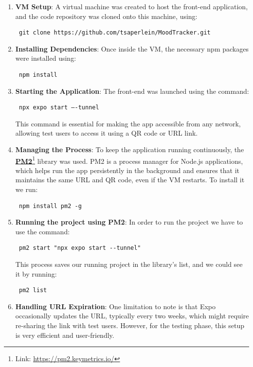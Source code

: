 \begin{enumerate}
    \item \textbf{VM Setup}: A virtual machine was created to host the front-end application, and the code repository was cloned onto this machine, using: \begin{verbatim} git clone https://github.com/tsaperlein/MoodTracker.git \end{verbatim}
    \item \textbf{Installing Dependencies}: Once inside the VM, the necessary npm packages were installed using: \begin{verbatim} npm install \end{verbatim}
    \item \textbf{Starting the Application}: The front-end was launched using the command: \begin{verbatim} npx expo start –-tunnel \end{verbatim}
    This command is essential for making the app accessible from any network, allowing test users to access it using a QR code or URL link.
    \item \textbf{Managing the Process}: To keep the application running continuously, the \textbf{\href{https://pm2.keymetrics.io/}{PM2}}\footnote{Link: \url{https://pm2.keymetrics.io/}} library was used. PM2 is a process manager for Node.js applications, which helps run the app persistently in the background and ensures that it maintains the same URL and QR code, even if the VM restarts. To install it we run: \begin{verbatim} npm install pm2 -g \end{verbatim}
    \item \textbf{Running the project using PM2}: In order to run the project we have to use the command: \begin{verbatim} pm2 start "npx expo start --tunnel" \end{verbatim}
    This process saves our running project in the library's list, and we could see it by running: \begin{verbatim} pm2 list \end{verbatim}
    \item \textbf{Handling URL Expiration}: One limitation to note is that Expo occasionally updates the URL, typically every two weeks, which might require re-sharing the link with test users. However, for the testing phase, this setup is very efficient and user-friendly.
\end{enumerate}

